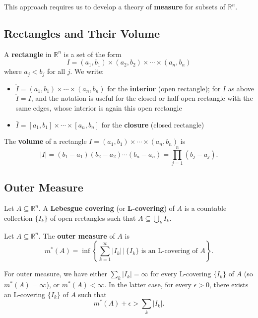 \documentclass[11pt]{report}
\begin{document}
This approach requires us to develop a theory of \textbf{measure} for subsets of $\mathbb{R}^n$.

\subsection{Rectangles and Their Volume}

\begin{defbox}
A \textbf{rectangle} in $\mathbb{R}^n$ is a set of the form
\[
I = (a_1, b_1) \times (a_2, b_2) \times \cdots \times (a_n, b_n)
\]
where $a_j < b_j$ for all $j$. We write:
\begin{itemize}
    \item $\mathring{I} = (a_1, b_1) \times \cdots \times (a_n, b_n)$ for the \textbf{interior} (open rectangle); for $I$ as above $\mathring{I} = I$, and the notation is useful for the closed or half-open rectangle with the same edges, whose interior is again this open rectangle
    \item $\bar{I} = [a_1, b_1] \times \cdots \times [a_n, b_n]$ for the \textbf{closure} (closed rectangle)
\end{itemize}
\end{defbox}

\begin{defbox}
The \textbf{volume} of a rectangle $I = (a_1, b_1) \times \cdots \times (a_n, b_n)$ is
\[
|I| = (b_1 - a_1)(b_2 - a_2) \cdots (b_n - a_n) = \prod_{j=1}^{n} (b_j - a_j).
\]
\end{defbox}

\subsection{Outer Measure}

\begin{defbox}[L-covering]
Let $A \subseteq \mathbb{R}^n$. A \textbf{Lebesgue covering} (or \textbf{L-covering}) of $A$ is a countable collection $\{I_k\}$ of open rectangles such that $A \subseteq \bigcup_k I_k$.
\end{defbox}

\begin{defbox}
Let $A \subseteq \mathbb{R}^n$. The \textbf{outer measure} of $A$ is
\[
m^*(A) = \inf \left\{ \sum_{k=1}^{\infty} |I_k| \,\bigg|\, \{I_k\} \text{ is an L-covering of } A \right\}.
\]
\end{defbox}

\begin{rembox}
For outer measure, we have either $\sum_k |I_k| = \infty$ for every L-covering $\{I_k\}$ of $A$ (so $m^*(A) = \infty$), or $m^*(A) < \infty$. In the latter case, for every $\epsilon > 0$, there exists an L-covering $\{I_k\}$ of $A$ such that
\[
m^*(A) + \epsilon > \sum_k |I_k|.
\]
\end{rembox}
\end{document}
